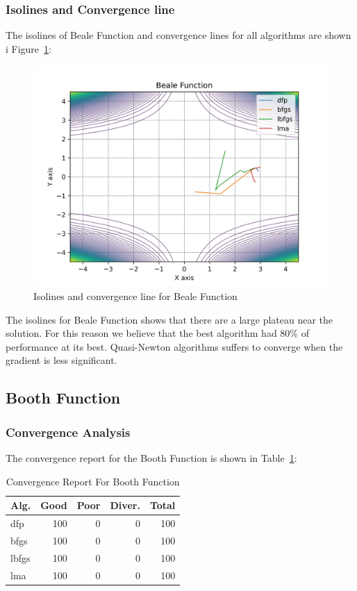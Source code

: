 \documentclass[conference]{IEEEtran}
\begin{document}
\subsubsection{Isolines and Convergence line}
\label{isolinesbeale2D}

The isolines of Beale Function and convergence lines for all algorithms are shown i Figure~\ref{fig:beale}:\begin{figure}[H]
\centering
\caption{Isolines and convergence line for Beale Function}
\label{fig:beale}
\includegraphics[scale=0.5]{images/beale.jpg}
\end{figure}
The isolines for Beale Function shows that there are a large plateau near the solution. For this reason we believe that the best algorithm had 80\% of performance at its best. Quasi-Newton algorithms suffers to converge when the gradient is less significant.\subsection{Booth Function}
\label{booth2D}

\subsubsection{Convergence Analysis}
\label{convergencebooth2D}


The convergence report for the Booth Function is shown in Table~\ref{convergence:booth}:

\begin{table}[H]
\centering
\caption{Convergence Report For Booth Function}
\label{convergence:booth}
\begin{tabular}{lrrrr}
\toprule
 Alg. &  Good &  Poor &  Diver. &  Total \\
\midrule
  dfp &   100 &     0 &       0 &    100 \\
 bfgs &   100 &     0 &       0 &    100 \\
lbfgs &   100 &     0 &       0 &    100 \\
  lma &   100 &     0 &       0 &    100 \\
\bottomrule
\end{tabular}
\end{table}
\end{document}
